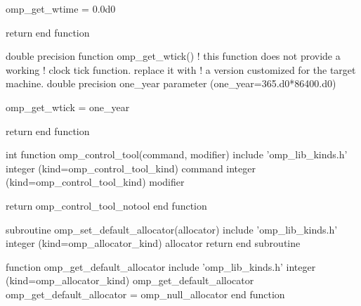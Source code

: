 {\begin{ompfFunction}
  omp_get_wtime = 0.0d0

  return
end function

double precision function omp_get_wtick()
  ! this function does not provide a working
  ! clock tick function. replace it with
  ! a version customized for the target machine.
  double precision one_year
  parameter (one_year=365.d0*86400.d0)

  omp_get_wtick = one_year

  return
end function

int function omp_control_tool(command, modifier)
  include 'omp_lib_kinds.h'
  integer (kind=omp_control_tool_kind) command
  integer (kind=omp_control_tool_kind) modifier

  return omp_control_tool_notool
end function

subroutine omp_set_default_allocator(allocator)
  include 'omp_lib_kinds.h'
  integer (kind=omp_allocator_kind) allocator
  return
end subroutine

function omp_get_default_allocator
  include 'omp_lib_kinds.h'
  integer (kind=omp_allocator_kind) omp_get_default_allocator
  omp_get_default_allocator = omp_null_allocator
end function

\end{ompfFunction}} %
